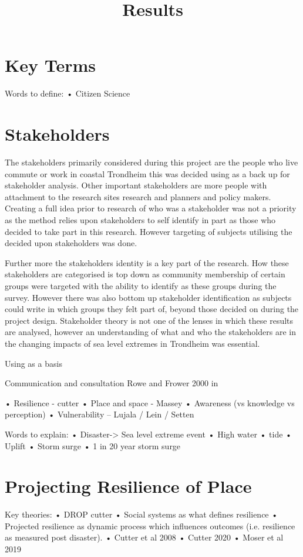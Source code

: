 \documentclass{article}
\begin{document}
\title{Results}
\section{Key Terms}
Words to define: 
•	Citizen Science \cite{tweddle_guide_2012}

\section{Stakeholders}

The stakeholders primarily considered during this project are the people who live commute or work in coastal Trondheim this was decided using \cite{reed_stakeholder_nodate} as a back up for stakeholder analysis. Other important stakeholders are more people with attachment to the research sites research and planners and policy makers. Creating a full idea prior to research of who was a stakeholder was not a priority as the method relies upon stakeholders to self identify in part as those who decided to take part in this research. However targeting of subjects utilising the decided upon stakeholders was done. 

Further more the stakeholders identity is a key part of the research. How these stakeholders are categorised is top down as community membership of certain groups were targeted with the ability to identify as these groups during the survey. However there was also bottom up stakeholder identification as subjects could write in which groups they felt part of, beyond those decided on during the project design. Stakeholder theory is not one of the lenses in which these results are analysed, however an understanding of what and who the stakeholders are in the changing impacts of sea level extremes in Trondheim was essential. 

Using \cite{reed_stakeholder_nodate} as a basis 

 



Communication and consultation Rowe and Frower 2000 in \cite{reed_stakeholder_nodate}

•	Resilience - cutter
•	Place and space - Massey
•	Awareness (vs knowledge vs perception)
•	Vulnerability – Lujala / Lein / Setten 

Words to explain:
•	Disaster-> Sea level extreme event
•	High water
•	tide
•	Uplift
•	Storm surge
•	1 in 20 year storm surge

\section{Projecting Resilience of Place}
Key theories:
•	DROP cutter
•	Social systems as what defines resilience
•	Projected resilience as dynamic process which influences outcomes (i.e. resilience as measured post disaster). 
•	Cutter et al 2008
•	Cutter 2020 
•	Moser et al 2019 
\end{document}
